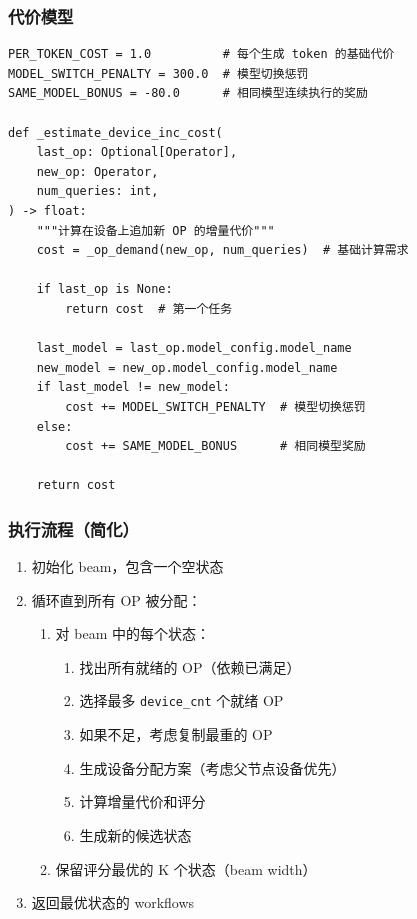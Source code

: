 \documentclass[12pt,a4paper]{article}
\begin{document}
\subsubsection{代价模型}

\begin{lstlisting}
PER_TOKEN_COST = 1.0          # 每个生成 token 的基础代价
MODEL_SWITCH_PENALTY = 300.0  # 模型切换惩罚
SAME_MODEL_BONUS = -80.0      # 相同模型连续执行的奖励

def _estimate_device_inc_cost(
    last_op: Optional[Operator],
    new_op: Operator,
    num_queries: int,
) -> float:
    """计算在设备上追加新 OP 的增量代价"""
    cost = _op_demand(new_op, num_queries)  # 基础计算需求
    
    if last_op is None:
        return cost  # 第一个任务
    
    last_model = last_op.model_config.model_name
    new_model = new_op.model_config.model_name
    if last_model != new_model:
        cost += MODEL_SWITCH_PENALTY  # 模型切换惩罚
    else:
        cost += SAME_MODEL_BONUS      # 相同模型奖励
    
    return cost
\end{lstlisting}

\subsubsection{执行流程（简化）}

\begin{enumerate}
    \item 初始化 beam，包含一个空状态
    \item 循环直到所有 OP 被分配：
    \begin{enumerate}
        \item 对 beam 中的每个状态：
        \begin{enumerate}
            \item 找出所有就绪的 OP（依赖已满足）
            \item 选择最多 \texttt{device\_cnt} 个就绪 OP
            \item 如果不足，考虑复制最重的 OP
            \item 生成设备分配方案（考虑父节点设备优先）
            \item 计算增量代价和评分
            \item 生成新的候选状态
        \end{enumerate}
        \item 保留评分最优的 K 个状态（beam width）
    \end{enumerate}
    \item 返回最优状态的 workflows
\end{enumerate}
\end{document}
